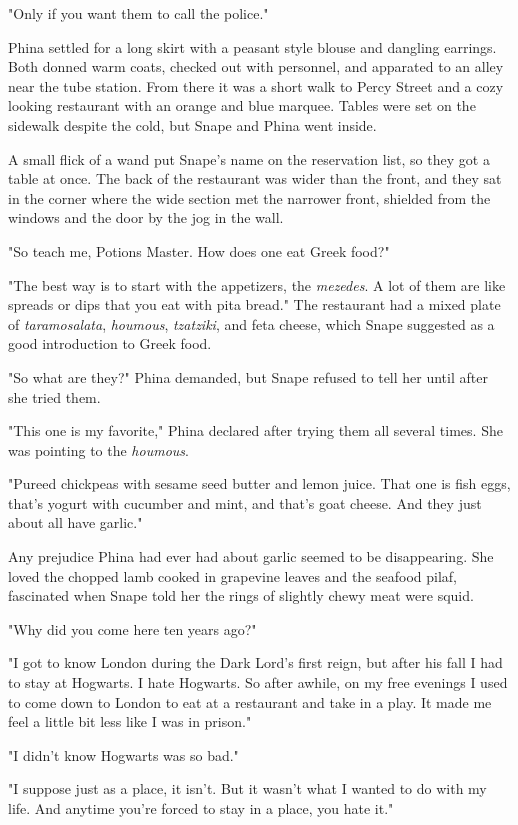 \documentclass[a4paper,11pt]{article}
\begin{document}
"Only if you want them to call the police."

Phina settled for a long skirt with a peasant style blouse and dangling earrings. Both donned warm coats, checked out with personnel, and apparated to an alley near the tube station. From there it was a short walk to Percy Street and a cozy looking restaurant with an orange and blue marquee. Tables were set on the sidewalk despite the cold, but Snape and Phina went inside.

A small flick of a wand put Snape's name on the reservation list, so they got a table at once. The back of the restaurant was wider than the front, and they sat in the corner where the wide section met the narrower front, shielded from the windows and the door by the jog in the wall.

"So teach me, Potions Master. How does one eat Greek food?"

"The best way is to start with the appetizers, the \emph{mezedes}. A lot of them are like spreads or dips that you eat with pita bread." The restaurant had a mixed plate of \emph{taramosalata}, \emph{houmous}, \emph{tzatziki}, and feta cheese, which Snape suggested as a good introduction to Greek food.

"So what are they?" Phina demanded, but Snape refused to tell her until after she tried them.

"This one is my favorite," Phina declared after trying them all several times. She was pointing to the \emph{houmous}.

"Pureed chickpeas with sesame seed butter and lemon juice. That one is fish eggs, that's yogurt with cucumber and mint, and that's goat cheese. And they just about all have garlic."

Any prejudice Phina had ever had about garlic seemed to be disappearing. She loved the chopped lamb cooked in grapevine leaves and the seafood pilaf, fascinated when Snape told her the rings of slightly chewy meat were squid.

"Why did you come here ten years ago?"

"I got to know London during the Dark Lord's first reign, but after his fall I had to stay at Hogwarts. I hate Hogwarts. So after awhile, on my free evenings I used to come down to London to eat at a restaurant and take in a play. It made me feel a little bit less like I was in prison."

"I didn't know Hogwarts was so bad."

"I suppose just as a place, it isn't. But it wasn't what I wanted to do with my life. And anytime you're forced to stay in a place, you hate it."
\end{document}
